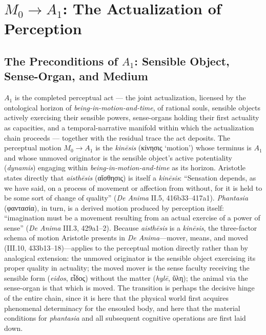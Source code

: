 \documentclass{article}
\newcommand{\gk}[1]{{\greekfont #1}}
\begin{document}
\section{$M_0 \rightarrow A_1$: The Actualization of Perception}

\subsection{The Preconditions of $A_1$: Sensible Object, Sense-Organ, and Medium}

$A_1$ is the completed perceptual act --- the joint actualization, licensed by the ontological horizon of \textit{being-in-motion-and-time}, of rational souls, sensible objects actively exercising their sensible powers, sense-organs holding their first actuality as capacities, and a temporal-narrative manifold within which the actualization chain proceeds --- together with the residual trace the act deposits. The perceptual motion $M_0 \rightarrow A_1$ is the \textit{kinēsis} (\gk{κίνησις} `motion') whose terminus is $A_1$ and whose unmoved originator is the sensible object's active potentiality (\textit{dynamis}) engaging within \textit{being-in-motion-and-time} as its horizon. Aristotle states directly that \textit{aisthēsis} (\gk{αἴσθησις}) is itself a \textit{kinēsis}: ``Sensation depends, as we have said, on a process of movement or affection from without, for it is held to be some sort of change of quality'' (\textit{De Anima} II.5, 416b33--417a1). \textit{Phantasia} (\gk{φαντασία}), in turn, is a derived motion produced by perception itself: ``imagination must be a movement resulting from an actual exercise of a power of sense'' (\textit{De Anima} III.3, 429a1--2). Because \textit{aisthēsis} is a \textit{kinēsis}, the three-factor schema of motion Aristotle presents in \textit{De Anima}---mover, means, and moved (III.10, 433b13--18)---applies to the perceptual motion directly rather than by analogical extension: the unmoved originator is the sensible object exercising its proper quality in actuality; the moved mover is the sense faculty receiving the sensible form (\textit{eidos}, \gk{εἶδος}) without the matter (\textit{hylē}, \gk{ὕλη}); the animal via the sense-organ is that which is moved. The transition is perhaps the decisive hinge of the entire chain, since it is here that the physical world first acquires phenomenal determinacy for the ensouled body, and here that the material conditions for \textit{phantasia} and all subsequent cognitive operations are first laid down.
\end{document}
